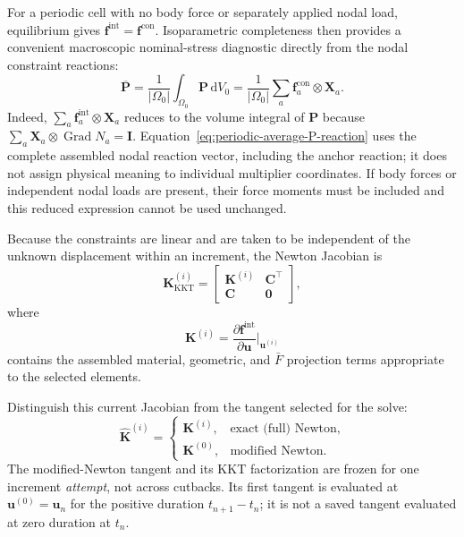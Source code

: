 \documentclass[11pt,a4paper]{article}
\newcommand{\bs}[1]{\boldsymbol{#1}}
\newcommand{\Grad}{\operatorname{Grad}}
\newcommand{\I}{\bs{I}}
\newcommand{\Pstress}{\bs{P}}
\newcommand{\vct}[1]{\mathbf{#1}}
\begin{document}
For a periodic cell with no body force or separately applied nodal load, equilibrium gives
$\vct f^{\mathrm{int}}=\vct f^{\mathrm{con}}$.  Isoparametric completeness then provides a convenient
macroscopic nominal-stress diagnostic directly from the nodal constraint reactions:
\begin{equation}
\boxed{
\overline{\Pstress}
=\frac{1}{|\Omega_0|}\int_{\Omega_0}\Pstress\,\mathrm dV_0
=\frac{1}{|\Omega_0|}\sum_a \bs f^{\mathrm{con}}_a\otimes\bs X_a .
}
\label{eq:periodic-average-P-reaction}
\end{equation}
Indeed, $\sum_a \bs f^{\mathrm{int}}_a\otimes\bs X_a$ reduces to the volume integral of $\Pstress$
because $\sum_a \bs X_a\otimes\Grad N_a=\I$.  Equation~\eqref{eq:periodic-average-P-reaction}
uses the complete assembled nodal reaction vector, including the anchor reaction; it does not assign physical
meaning to individual multiplier coordinates.  If body forces or independent nodal loads are present, their
force moments must be included and this reduced expression cannot be used unchanged.

Because the constraints are linear and are taken to be independent of the unknown displacement within an increment, the Newton Jacobian is
\begin{equation}
\boxed{
\vct{K}_{\mathrm{KKT}}^{(i)}
=
\begin{bmatrix}
\vct K^{(i)} & \vct C^\top\\
\vct C & \vct0
\end{bmatrix},
}
\label{eq:kkt-matrix}
\end{equation}
where
\begin{equation}
\vct K^{(i)}
=
\frac{\partial\vct f^{\mathrm{int}}}{\partial\vct u}
\bigg|_{\vct u^{(i)}}
\end{equation}
contains the assembled material, geometric, and $\bar F$ projection terms appropriate to the selected elements.

Distinguish this current Jacobian from the tangent selected for the solve:
\begin{equation}
\widehat{\vct K}^{(i)}=
\begin{cases}
\vct K^{(i)}, & \text{exact (full) Newton},\\
\vct K^{(0)}, & \text{modified Newton}.
\end{cases}
\label{eq:kkt-tangent-choice}
\end{equation}
The modified-Newton tangent and its KKT factorization are frozen for one increment \emph{attempt}, not across cutbacks. Its first tangent is evaluated at $\vct u^{(0)}=\vct u_n$ for the positive duration $t_{n+1}-t_n$; it is not a saved tangent evaluated at zero duration at $t_n$.
\end{document}
